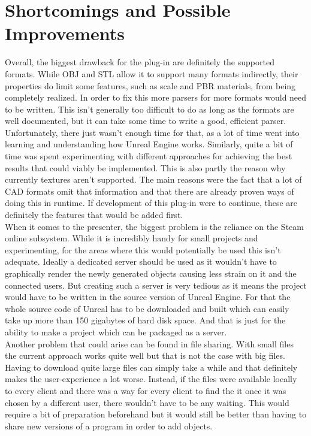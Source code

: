 \section{Shortcomings and Possible Improvements}

Overall, the biggest drawback for the plug-in are definitely the supported formats. While OBJ and STL allow it to support many formats indirectly, their properties do limit some features, such as scale and \acs{PBR} materials, from being completely realized. In order to fix this more parsers for more formats would need to be written. This isn't generally too difficult to do as long as the formats are well documented, but it can take some time to write a good, efficient parser. Unfortunately, there just wasn't enough time for that, as a lot of time went into learning and understanding how Unreal Engine works. Similarly, quite a bit of time was spent experimenting with different approaches for achieving the best results that could viably be implemented. This is also partly the reason why currently textures aren't supported. The main reasons were the fact that a lot of \acs{CAD} formats omit that information and that there are already proven ways of doing this in runtime\cite{bib:RunTex}. If development of this plug-in were to continue, these are definitely the features that would be added first.\\
When it comes to the presenter, the biggest problem is the reliance on the Steam online subsystem. While it is incredibly handy for small projects and experimenting, for the areas where this would potentially be used this isn't adequate. Ideally a dedicated server should be used as it wouldn't have to graphically render the newly generated objects causing less strain on it and the connected users. But creating such a server is very tedious as it means the project would have to be written in the source version of Unreal Engine. For that the whole source code of Unreal has to be downloaded and built which can easily take up more than 150 gigabytes of hard disk space. And that is just for the ability to make a project which can be packaged as a server.\\ 
Another problem that could arise can be found in file sharing. With small files the current approach works quite well but that is not the case with big files. Having to download quite large files can simply take a while and that definitely makes the user-experience a lot worse. Instead, if the files were available locally to every client and there was a way for every client to find the it once it was chosen by a different user, there wouldn't have to be any waiting. This would require a bit of preparation beforehand but it would still be better than having to share new versions of a program in order to add objects.\\